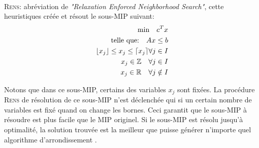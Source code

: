 \documentclass[12pt,a4paper,oneside]{book}
\theoremstyle{definition}
\newcommand{\R}{\mathbb{R}}
\DeclarePairedDelimiter\ceil{\lceil}{\rceil}
\DeclarePairedDelimiter\floor{\lfloor}{\rfloor}
\begin{document}
	\paragraph{}
	\textsc{Rens:} abréviation de \textit{"Relaxation Enforced Neighborhood Search"}, cette heuristiques créée et résout le sous-MIP suivant:
	\begin{equation}
		\begin{aligned}
		\text{min} \hspace{10pt}  c^T x \\
		\text{telle que:} \hspace{10pt} Ax \leq b \\ 
		\floor{x_j} \leq x_j \leq \ceil{x_j} \forall j \in I \\
		x_j \in \mathbb{Z} \hspace{10pt} \forall j \in I \\
		 x_j \in \R \hspace{10pt} \forall j \notin I
		\end{aligned}
	\end{equation}
	
	Notons que dans ce sous-MIP, certains des variables $x_j$ sont fixées. La procédure \textsc{Rens} de résolution de ce sous-MIP n'est déclenchée qui si un certain nombre de variables est fixé quand on change les bornes. Ceci garantit que le sous-MIP à résoudre est plus facile que le MIP originel. Si le sous-MIP est résolu jusqu'à optimalité, la solution trouvée est la meilleur que puisse générer n'importe quel algorithme d'arrondissement \cite{berthold2006}.
	
\end{document}
